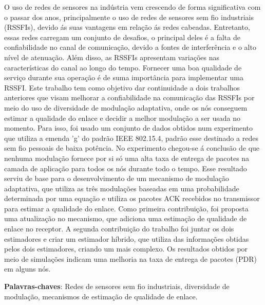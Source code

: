 \setlength{\absparsep}{18pt} %
\begin{resumo}
   O uso de redes de sensores na indústria vem crescendo de forma significativa com o passar dos anos, principalmente o uso de redes de sensores sem fio industriais (RSSFIs), devido ás suas vantagens em relação ás redes cabeadas. Entretanto, essas redes carregam um conjunto de desafios, o principal deles é a falta de confiabilidade no canal de comunicação, devido a fontes de interferência e o alto nível de atenuação. Além disso, as RSSFIs apresentam variações nas características do canal ao longo do tempo. Fornecer uma boa qualidade de serviço durante sua operação é de suma importância para implementar uma RSSFI. Este trabalho tem como objetivo dar continuidade a dois trabalhos anteriores que visam melhorar a confiabilidade na comunicação das RSSFIs por meio do uso de diversidade de modulação adaptativa, onde os nós conseguem estimar a qualidade do enlace e decidir a melhor modulação a ser usada no momento. Para isso, foi usado um conjunto de dados obtidos num experimento que utiliza a emenda 'g' do padrão IEEE 802.15.4, padrão esse destinado a redes sem fio pessoais de baixa potência. No experimento chegou-se á conclusão de que nenhuma modulação fornece por si só uma alta taxa de entrega de pacotes na camada de aplicação para todos os nós durante todo o tempo. Esse resultado serviu de base para o desenvolvimento de um mecanismo de modulação adaptativa, que utiliza as três modulações baseadas em uma probabilidade determinada por uma equação e utiliza os pacotes ACK recebidos no transmissor para estimar a qualidade do enlace. Como primeira contribuição, foi proposta uma atualização no mecanismo, que adiciona uma estimação de qualidade de enlace no receptor. A segunda contribuição do trabalho foi juntar os dois estimadores e criar um estimador híbrido, que utiliza das informações obtidas pelos dois estimadores,  criando um mais complexo. Os resultados obtidos por meio de simulações indicam uma melhoria na taxa de entrega de pacotes (PDR) em alguns nós.
   
\vspace{\onelineskip}

  \textbf{Palavras-chaves}: Redes de sensores sem fio industriais, diversidade de modulação, mecanismos de estimação de qualidade de enlace. 
\end{resumo}


